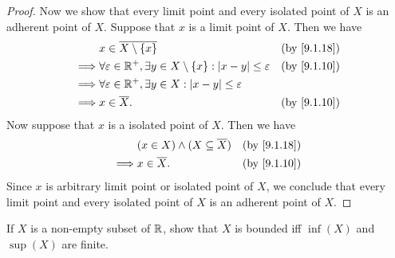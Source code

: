 \begin{proof}
  Now we show that every limit point and every isolated point of \(X\) is an adherent point of \(X\).
  Suppose that \(x\) is a limit point of \(X\).
  Then we have
  \begin{align*}
             & x \in \overline{X \setminus \set{x}}                                                           &  & \by{9.1.18} \\
    \implies & \forall \varepsilon \in \R^+, \exists y \in X \setminus \set{x} : \abs{x - y} \leq \varepsilon &  & \by{9.1.10} \\
    \implies & \forall \varepsilon \in \R^+, \exists y \in X : \abs{x - y} \leq \varepsilon                                    \\
    \implies & x \in \overline{X}.                                                                            &  & \by{9.1.10}
  \end{align*}
  Now suppose that \(x\) is a isolated point of \(X\).
  Then we have
  \begin{align*}
             & (x \in X) \land (X \subseteq \overline{X}) &  & \by{9.1.18} \\
    \implies & x \in \overline{X}.                        &  & \by{9.1.10}
  \end{align*}
  Since \(x\) is arbitrary limit point or isolated point of \(X\), we conclude that every limit point and every isolated point of \(X\) is an adherent point of \(X\).
\end{proof}

\begin{ex}\label{ex:9.1.10}
  If \(X\) is a non-empty subset of \(\mathbb{R}\), show that \(X\) is bounded iff \(\inf(X)\) and \(\sup(X)\) are finite.
\end{ex}

